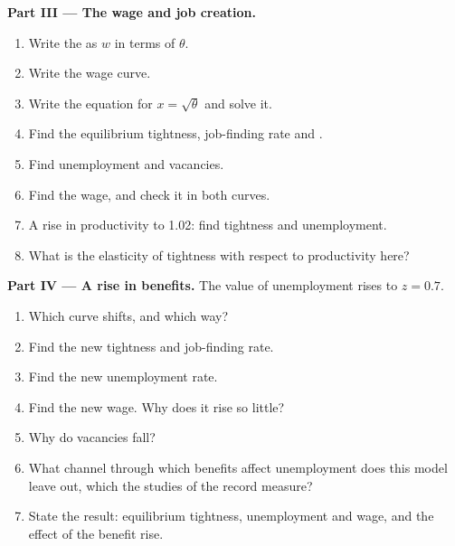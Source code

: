 \begin{problem}
\medskip
\noindent\textbf{Part III --- The wage and job creation.}
\begin{enumerate}[resume]
  \item Write the  as $w$ in terms of $\theta$.
  \item Write the wage curve.
  \item Write the equation for $x = \sqrt\theta$ and solve it.
  \item Find the equilibrium tightness, job-finding rate and .
  \item Find unemployment and vacancies.
  \item Find the wage, and check it in both curves.
  \item A rise in productivity to 1.02: find tightness and unemployment.
  \item What is the elasticity of tightness with respect to productivity here?
\end{enumerate}

\medskip
\noindent\textbf{Part IV --- A rise in benefits.} The value of unemployment rises to $z = 0.7$.
\begin{enumerate}[resume]
  \item Which curve shifts, and which way?
  \item Find the new tightness and job-finding rate.
  \item Find the new unemployment rate.
  \item Find the new wage. Why does it rise so little?
  \item Why do vacancies fall?
  \item What channel through which benefits affect unemployment does this model leave out, which the studies of the record
  measure?
  \item State the result: equilibrium tightness, unemployment and wage, and the effect of the benefit rise.
\end{enumerate}
\end{problem}
